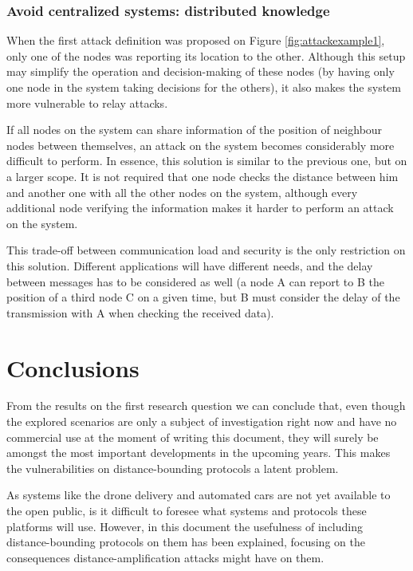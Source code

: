 \documentclass{article}
\begin{document}
\subsubsection{Avoid centralized systems: distributed knowledge}

When the first attack definition was proposed on Figure \ref{fig:attackexample1}, only one of the nodes was reporting its location to the other. Although this setup may simplify the operation and decision-making of these nodes (by having only one node in the system taking decisions for the others), it also makes the system more vulnerable to relay attacks.

If all nodes on the system can share information of the position of neighbour nodes between themselves, an attack on the system becomes considerably more difficult to perform. In essence, this solution is similar to the previous one, but on a larger scope. It is not required that one node checks the distance between him and another one with all the other nodes on the system, although every additional node verifying the information makes it harder to perform an attack on the system.

This trade-off between communication load and security is the only restriction on this solution. Different applications will have different needs, and the delay between messages has to be considered as well (a node A can report to B the position of a third node C on a given time, but B must consider the delay of the transmission with A when checking the received data).










\section{Conclusions}
\label{sec:conclusions}

From the results on the first research question we can conclude that, even though the explored scenarios are only a subject of investigation right now and have no commercial use at the moment of writing this document, they will surely be amongst the most important developments in the upcoming years. This makes the vulnerabilities on distance-bounding protocols a latent problem.

As systems like the drone delivery and automated cars are not yet available to the open public, is it difficult to foresee what systems and protocols these platforms will use. However, in this document the usefulness of including distance-bounding protocols on them has been explained, focusing on the consequences distance-amplification attacks might have on them.
\end{document}
